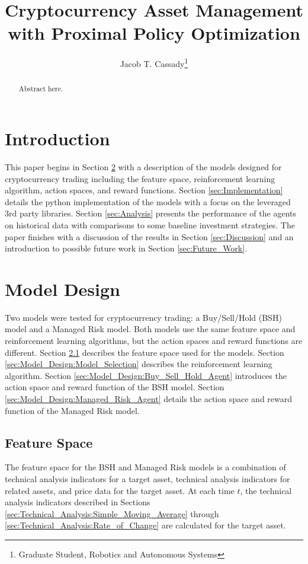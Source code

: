 \documentclass[journal]{new-aiaa}
\title{Cryptocurrency Asset Management with Proximal Policy Optimization}
\author{Jacob T. Cassady\footnote{Graduate Student, Robotics and Autonomous Systems}}
\affil{Johns Hopkins Whiting School of Engineering, Baltimore, Maryland, 21218}
\begin{document}
\maketitle
\begin{abstract}
        Abstract here.
\end{abstract}

\section{Introduction}\label{sec:Introduction}
This paper begins in Section \ref{sec:Model_Design} with a description of the models designed for cryptocurrency trading including the feature space, reinforcement learning algorithm, action spaces, and reward functions.
Section \ref{sec:Implementation} details the python implementation of the models with a focus on the leveraged 3rd party libraries.
Section \ref{sec:Analysis} presents the performance of the agents on historical data with comparisons to some baseline investment strategies.
The paper finishes with a discussion of the results in Section \ref{sec:Discussion} and an introduction to possible future work in Section \ref{sec:Future_Work}.

\section{Model Design}\label{sec:Model_Design}
Two models were tested for cryptocurrency trading: a Buy/Sell/Hold (BSH) model and a Managed Risk model.
Both models use the same feature space and reinforcement learning algorithms, but the action spaces and reward functions are different.
Section \ref{sec:Model_Design:Feature_Engineering} describes the feature space used for the models.
Section \ref{sec:Model_Design:Model_Selection} describes the reinforcement learning algorithm.
Section \ref{sec:Model_Design:Buy_Sell_Hold_Agent} introduces the action space and reward function of the BSH model.
Section \ref{sec:Model_Design:Managed_Risk_Agent} details the action space and reward function of the Managed Risk model.

\subsection{Feature Space}\label{sec:Model_Design:Feature_Engineering}
The feature space for the BSH and Managed Risk models is a combination of technical analysis indicators for a target asset, technical analysis indicators for related assets, and price data for the target asset.
At each time $t$, the technical analysis indicators described in Sections \ref{sec:Technical_Analysis:Simple_Moving_Average} through \ref{sec:Technical_Analysis:Rate_of_Change} are calculated for the target asset.
\end{document}
